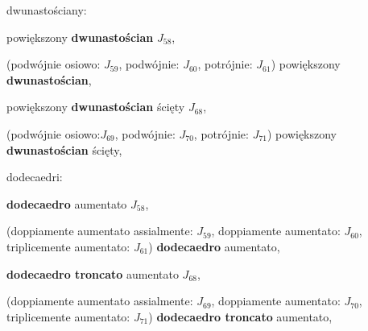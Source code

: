 \begin{compactitem}
\begin{compactitem}
\begin{compactitem}
\begin{compactitem}
\begin{compactitem}
\begin{compactitem}
\begin{compactitem}
\begin{compactitem}
\begin{compactitem}
    \item dwunastościany: \begin{compactitem} %
        \item powiększony \textbf{dwunastościan} $J_{58}$, %
        \item (podwójnie osiowo: $J_{59}$, podwójnie: $J_{60}$, potrójnie: $J_{61}$) powiększony \textbf{\textbf{dwunastościan}}, %
        \item powiększony \textbf{dwunastościan} ścięty $J_{68}$, %
        \item (podwójnie osiowo:$J_{69}$, podwójnie: $J_{70}$, potrójnie: $J_{71}$) powiększony \textbf{dwunastościan} ścięty, %
    \item dodecaedri: \begin{compactitem} %
        \item \textbf{dodecaedro} aumentato $J_{58}$, %
        \item (\!doppiamente aumentato assialmente: $J_{59}$, doppiamente aumentato: $J_{60}$, triplicemente aumentato: $J_{61}$) \textbf{dodecaedro} aumentato, %
        \item \textbf{dodecaedro troncato} aumentato $J_{68}$, %
        \item (\!doppiamente aumentato assialmente: $J_{69}$, doppiamente aumentato: $J_{70}$, triplicemente aumentato: $J_{71}$) \textbf{dodecaedro troncato} aumentato, %
    \end{compactitem}


\end{compactitem}
\end{compactitem}
\end{compactitem}
\end{compactitem}
\end{compactitem}
\end{compactitem}
\end{compactitem}
\end{compactitem}
\end{compactitem}
\end{compactitem}
